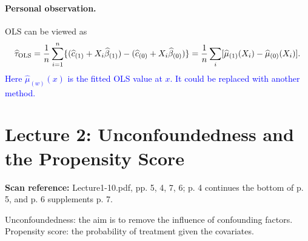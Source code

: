 \documentclass[11pt,a4paper]{article}
\newcommand{\sourcepages}[1]{\par{\small\sffamily\color{muted}\textbf{Scan reference:} #1\par}\nobreak\smallskip\nopagebreak[4]}
\newcommand{\inkblue}[1]{\textcolor{blue}{#1}}
\begin{document}
\paragraph{Personal observation.}
OLS can be viewed as
\[
\widehat\tau_{\rm OLS}=\frac1n\sum_{i=1}^n
\{(\widehat c_{(1)}+X_i\widehat\beta_{(1)})
 -(\widehat c_{(0)}+X_i\widehat\beta_{(0)})\}
=\frac1n\sum_i[\widehat\mu_{(1)}(X_i)-\widehat\mu_{(0)}(X_i)].
\]
\inkblue{Here $\widehat\mu_{(w)}(x)$ is the fitted OLS value at $x$. It could be replaced with another method.}

\section{Lecture 2: Unconfoundedness and the Propensity Score}
\sourcepages{Lecture1-10.pdf, pp. 5, 4, 7, 6; p. 4 continues the bottom of p. 5, and p. 6 supplements p. 7.}
Unconfoundedness: the aim is to remove the influence of confounding factors. Propensity score: the probability of treatment given the covariates.
\end{document}
